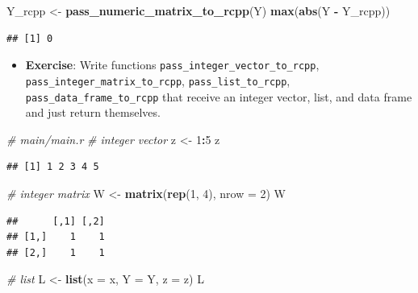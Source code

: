\documentclass[]{book}
\newenvironment{Shaded}{\begin{snugshade}}{\end{snugshade}}
\newcommand{\KeywordTok}[1]{\textcolor[rgb]{0.13,0.29,0.53}{\textbf{#1}}}
\newcommand{\DataTypeTok}[1]{\textcolor[rgb]{0.13,0.29,0.53}{#1}}
\newcommand{\DecValTok}[1]{\textcolor[rgb]{0.00,0.00,0.81}{#1}}
\newcommand{\StringTok}[1]{\textcolor[rgb]{0.31,0.60,0.02}{#1}}
\newcommand{\CommentTok}[1]{\textcolor[rgb]{0.56,0.35,0.01}{\textit{#1}}}
\newcommand{\OperatorTok}[1]{\textcolor[rgb]{0.81,0.36,0.00}{\textbf{#1}}}
\newcommand{\NormalTok}[1]{#1}
\providecommand{\tightlist}{%
  \setlength{\itemsep}{0pt}\setlength{\parskip}{0pt}}
\begin{document}
\begin{Shaded}
\begin{Highlighting}[]
\NormalTok{Y_rcpp <-}\StringTok{ }\KeywordTok{pass_numeric_matrix_to_rcpp}\NormalTok{(Y)}
\KeywordTok{max}\NormalTok{(}\KeywordTok{abs}\NormalTok{(Y }\OperatorTok{-}\StringTok{ }\NormalTok{Y_rcpp))}
\end{Highlighting}
\end{Shaded}

\begin{verbatim}
## [1] 0
\end{verbatim}

\begin{itemize}
\tightlist
\item
  \textbf{Exercise}: Write functions
  \texttt{pass\_integer\_vector\_to\_rcpp},
  \texttt{pass\_integer\_matrix\_to\_rcpp},
  \texttt{pass\_list\_to\_rcpp}, \texttt{pass\_data\_frame\_to\_rcpp}
  that receive an integer vector, list, and data frame and just return
  themselves.
\end{itemize}

\begin{Shaded}
\begin{Highlighting}[]
\CommentTok{# main/main.r}
\CommentTok{# integer vector}
\NormalTok{z <-}\StringTok{ }\DecValTok{1}\OperatorTok{:}\DecValTok{5}
\NormalTok{z}
\end{Highlighting}
\end{Shaded}

\begin{verbatim}
## [1] 1 2 3 4 5
\end{verbatim}

\begin{Shaded}
\begin{Highlighting}[]
\CommentTok{# integer matrix}
\NormalTok{W <-}\StringTok{ }\KeywordTok{matrix}\NormalTok{(}\KeywordTok{rep}\NormalTok{(}\DecValTok{1}\NormalTok{, }\DecValTok{4}\NormalTok{), }\DataTypeTok{nrow =} \DecValTok{2}\NormalTok{)}
\NormalTok{W}
\end{Highlighting}
\end{Shaded}

\begin{verbatim}
##      [,1] [,2]
## [1,]    1    1
## [2,]    1    1
\end{verbatim}

\begin{Shaded}
\begin{Highlighting}[]
\CommentTok{# list}
\NormalTok{L <-}\StringTok{ }\KeywordTok{list}\NormalTok{(}\DataTypeTok{x =}\NormalTok{ x, }\DataTypeTok{Y =}\NormalTok{ Y, }\DataTypeTok{z =}\NormalTok{ z)}
\NormalTok{L}
\end{Highlighting}
\end{Shaded}
\end{document}
